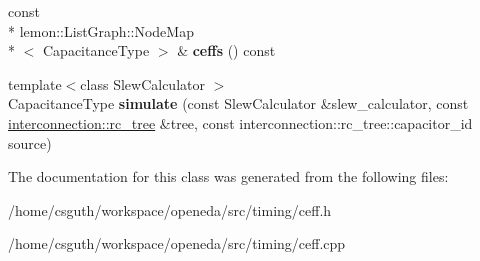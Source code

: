 \begin{DoxyCompactItemize}
\item 
\hypertarget{classophidian_1_1timing_1_1lumped__capacitance__wire__model_a0511d2310e1b4fb2857b7630e8fb2d4e}{const \\*
lemon\-::\-List\-Graph\-::\-Node\-Map\\*
$<$ Capacitance\-Type $>$ \& {\bfseries ceffs} () const }\label{classophidian_1_1timing_1_1lumped__capacitance__wire__model_a0511d2310e1b4fb2857b7630e8fb2d4e}

\item 
\hypertarget{classophidian_1_1timing_1_1lumped__capacitance__wire__model_a4a8142e1995284d2dbb798a43121fee9}{{\footnotesize template$<$class Slew\-Calculator $>$ }\\Capacitance\-Type {\bfseries simulate} (const Slew\-Calculator \&slew\-\_\-calculator, const \hyperlink{classophidian_1_1interconnection_1_1rc__tree}{interconnection\-::rc\-\_\-tree} \&tree, const interconnection\-::rc\-\_\-tree\-::capacitor\-\_\-id source)}\label{classophidian_1_1timing_1_1lumped__capacitance__wire__model_a4a8142e1995284d2dbb798a43121fee9}

\end{DoxyCompactItemize}


The documentation for this class was generated from the following files\-:\begin{DoxyCompactItemize}
\item 
/home/csguth/workspace/openeda/src/timing/ceff.\-h\item 
/home/csguth/workspace/openeda/src/timing/ceff.\-cpp\end{DoxyCompactItemize}
